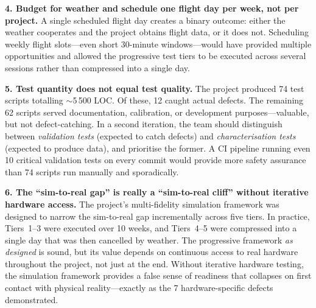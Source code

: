 \textbf{4. Budget for weather and schedule one flight day per week, not per project.}
A single scheduled flight day creates a binary outcome: either the weather cooperates and the project obtains flight data, or it does not. Scheduling weekly flight slots---even short 30-minute windows---would have provided multiple opportunities and allowed the progressive test tiers to be executed across several sessions rather than compressed into a single day.

\textbf{5. Test quantity does not equal test quality.}
The project produced 74 test scripts totalling ${\sim}$5\,500 LOC. Of these, 12 caught actual defects. The remaining 62 scripts served documentation, calibration, or development purposes---valuable, but not defect-catching. In a second iteration, the team should distinguish between \emph{validation tests} (expected to catch defects) and \emph{characterisation tests} (expected to produce data), and prioritise the former. A CI pipeline running even 10 critical validation tests on every commit would provide more safety assurance than 74 scripts run manually and sporadically.

\textbf{6. The ``sim-to-real gap'' is really a ``sim-to-real cliff'' without iterative hardware access.}
The project's multi-fidelity simulation framework was designed to narrow the sim-to-real gap incrementally across five tiers. In practice, Tiers~1--3 were executed over 10 weeks, and Tiers~4--5 were compressed into a single day that was then cancelled by weather. The progressive framework \emph{as designed} is sound, but its value depends on continuous access to real hardware throughout the project, not just at the end. Without iterative hardware testing, the simulation framework provides a false sense of readiness that collapses on first contact with physical reality---exactly as the 7 hardware-specific defects demonstrated.
